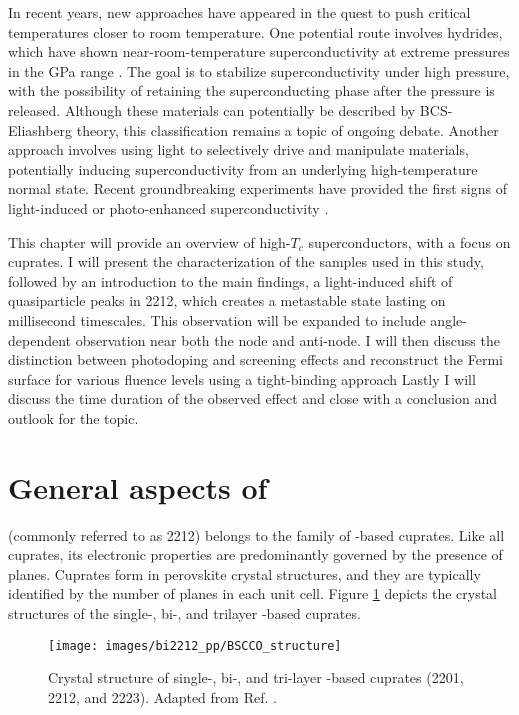 In recent years, new approaches have appeared in the quest to push critical temperatures closer to room temperature.
One potential route involves hydrides, which have shown near-room-temperature superconductivity at extreme pressures in the \unit{\giga\pascal} range \cite{duan_structure_2017}.
The goal is to stabilize superconductivity under high pressure, with the possibility of retaining the superconducting phase after the pressure is released.
Although these materials can potentially be described by BCS-Eliashberg theory, this classification remains a topic of ongoing debate.
Another approach involves using light to selectively drive and manipulate materials, potentially inducing superconductivity from an underlying high-temperature normal state.
Recent groundbreaking experiments have provided the first signs of light-induced or photo-enhanced superconductivity \cite{fausti_light-induced_2011, buzzi_phase_2021, fava_magnetic_2024}.

This chapter will provide an overview of high-$T_c$ superconductors, with a focus on cuprates.
I will present the characterization of the samples used in this study, followed by an introduction to the main findings, a light-induced shift of quasiparticle peaks in 2212, which creates a metastable state lasting on millisecond timescales.
This observation will be expanded to include angle-dependent observation near both the node and anti-node.
I will then discuss the distinction between photodoping and screening effects and reconstruct the Fermi surface for various fluence levels using a tight-binding approach
Lastly I will discuss the time duration of the observed effect and close with a conclusion and outlook for the topic.

\section{General aspects of }
\label{sec:bscco_general}

 (commonly referred to as 2212) belongs to the family of -based cuprates.
Like all cuprates, its electronic properties are predominantly governed by the presence of  planes.
Cuprates form in perovskite crystal structures, and they are typically identified by the number of  planes in each unit cell.
Figure \ref{fig:bscco_structure} depicts the crystal structures of the single-, bi-, and trilayer -based cuprates.

\begin{figure}
	\centering
	\texttt{[image: images/bi2212\_pp/BSCCO\_structure]}
	\caption{Crystal structure of single-, bi-, and tri-layer -based cuprates  (2201, 2212, and 2223). Adapted from Ref. \cite{nazargulov_english_2009}.}
	\label{fig:bscco_structure}
\end{figure}

